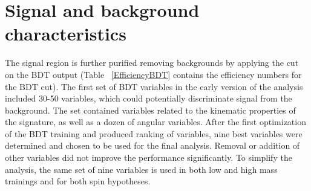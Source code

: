 \begin{table}
\begin{center}
\label{EfficiencyBDT}                                                                                                                                                                  
\end{center}                                                                                                                                                                           
\end{table} 


%
%
%


\section{Signal and background characteristics}

The signal region is further purified removing backgrounds by applying the cut on the BDT
output (Table ~\ref{EfficiencyBDT} contains the efficiency numbers for the BDT cut). 
The first set of BDT variables in the early version of the analysis included 30-50 variables, which could potentially discriminate signal from the background. The set contained variables related to the kinematic properties of the signature, as well as a dozen of angular variables. After the first optimization of the BDT training and produced ranking of variables, nine best variables were determined and chosen to be used for the final analysis. Removal or addition of other variables did not improve the performance significantly. To simplify the analysis, the same set of nine variables is used in both low and high mass trainings and for both spin hypotheses.

